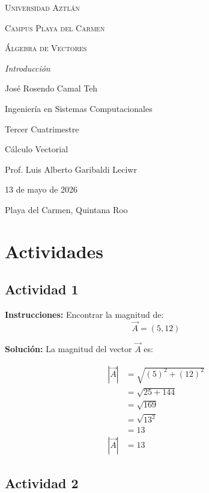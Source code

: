 \documentclass[12pt]{article}
\begin{document}
\begin{titlepage}
	\centering
	{\scshape\LARGE Universidad Aztlán \par}
	\vspace{1cm}
	{\scshape\Large Campus Playa del Carmen \par}
	\vspace{3cm}
	{\scshape\Huge Álgebra de Vectores \par}
	\vspace{1cm}
	{\itshape\Large Introducción \par}
	\vspace{3cm}
	{\Large José Rosendo Camal Teh \par}
	\vfill
	{\Large Ingeniería en Sistemas Computacionales \par}
	{\Large Tercer Cuatrimestre \par}
	{\Large Cálculo Vectorial \par}
	\vfill
	{\Large Prof. Luis Alberto Garibaldi Leciwr \par}
	\vfill
	{\Large 13 de mayo de 2026 \par}
	\vfill
	{\Large Playa del Carmen, Quintana Roo \par}
\end{titlepage}

\section*{Actividades}

\subsection*{Actividad 1}

\textbf{Instrucciones:} Encontrar la magnitud de:
\[ \vec{A} = \left( 5, 12 \right) \]

\textbf{Solución:}
La magnitud del vector $\vec{A}$ es:

\begin{align*}
	|\vec{A}| &= \sqrt{ (5)^{2} + (12)^2 } \\
	&= \sqrt{ 25 + 144 } \\
	&= \sqrt{169} \\
	&= \sqrt{ 13^{2} } \\
	&= 13 \\
	|\vec{A}| &= 13
\end{align*}
\newline

\subsection*{Actividad 2}
\end{document}
